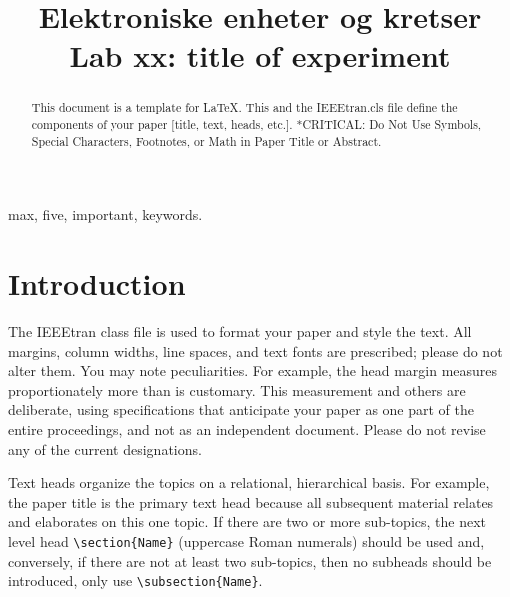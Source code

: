 \documentclass[conference]{IEEEtran}
\begin{document}
\title{Elektroniske enheter og kretser\\
Lab xx: title of experiment}

\author{
}

\maketitle


\begin{abstract}
This document is a template for \LaTeX.
This and the IEEEtran.cls file define the components of your paper [title, text, heads, etc.]. *CRITICAL: Do Not Use Symbols, Special Characters, Footnotes, 
or Math in Paper Title or Abstract.
\end{abstract}

\begin{IEEEkeywords}
max, five, important, keywords.
\end{IEEEkeywords}

\section{Introduction}

The IEEEtran class file is used to format your paper and style the text. All margins, 
column widths, line spaces, and text fonts are prescribed; please do not 
alter them. You may note peculiarities. For example, the head margin
measures proportionately more than is customary. This measurement 
and others are deliberate, using specifications that anticipate your paper 
as one part of the entire proceedings, and not as an independent document. 
Please do not revise any of the current designations.

Text heads organize the topics on a relational, hierarchical basis. For 
example, the paper title is the primary text head because all subsequent 
material relates and elaborates on this one topic. If there are two or more 
sub-topics, the next level head \verb|\section{Name}| (uppercase Roman numerals) should be used 
and, conversely, if there are not at least two sub-topics, then no subheads 
should be introduced, only use \verb|\subsection{Name}|.
\end{document}

